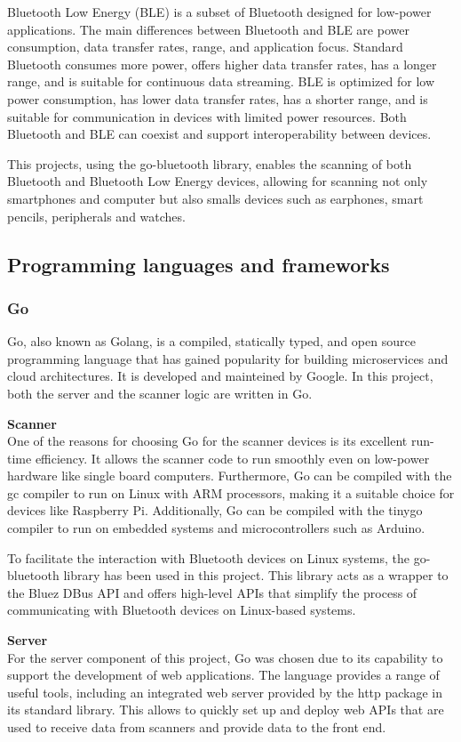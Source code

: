 \documentclass[a4paper, 11pt]{article}
\begin{document}
Bluetooth Low Energy (BLE) is a subset of Bluetooth designed for low-power applications. The main differences between Bluetooth and BLE are power consumption, data transfer rates, range, and application focus. Standard Bluetooth consumes more power, offers higher data transfer rates, has a longer range, and is suitable for continuous data streaming. BLE is optimized for low power consumption, has lower data transfer rates, has a shorter range, and is suitable for communication in devices with limited power resources. Both Bluetooth and BLE can coexist and support interoperability between devices.

This projects, using the go-bluetooth library, enables the scanning of both Bluetooth and Bluetooth Low Energy devices, allowing for scanning not only smartphones and computer but also smalls devices such as earphones, smart pencils, peripherals and watches.

\subsection{Programming languages and frameworks}
\subsubsection{Go}
Go, also known as Golang, is a compiled, statically typed, and open source programming language that has gained popularity for building microservices and cloud architectures. It is developed and mainteined by Google. In this project, both the server and the scanner logic are written in Go.

\textbf{Scanner}\\
One of the reasons for choosing Go for the scanner devices is its excellent run-time efficiency. It allows the scanner code to run smoothly even on low-power hardware like single board computers. Furthermore, Go can be compiled with the gc compiler to run on Linux with ARM processors, making it a suitable choice for devices like Raspberry Pi. Additionally, Go can be compiled with the tinygo compiler to run on embedded systems and microcontrollers such as Arduino.

To facilitate the interaction with Bluetooth devices on Linux systems, the go-bluetooth library \cite{go-bluetooth} has been used in this project. This library acts as a wrapper to the Bluez DBus API and offers high-level APIs that simplify the process of communicating with Bluetooth devices on Linux-based systems.

\textbf{Server}\\
For the server component of this project, Go was chosen due to its capability to support the development of web applications. The language provides a range of useful tools, including an integrated web server provided by the http package \cite{go-http} in its standard library. This allows to quickly set up and deploy web APIs that are used to receive data from scanners and provide data to the front end.
\end{document}
